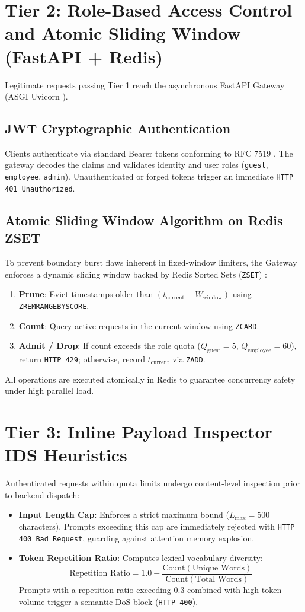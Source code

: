 \section{Tier 2: Role-Based Access Control and Atomic Sliding Window (FastAPI + Redis)}
Legitimate requests passing Tier 1 reach the asynchronous FastAPI Gateway (ASGI Uvicorn \cite{fastapi}). 

\subsection{JWT Cryptographic Authentication}
Clients authenticate via standard Bearer tokens conforming to RFC 7519 \cite{rfc7519}. The gateway decodes the claims and validates identity and user roles (\texttt{guest}, \texttt{employee}, \texttt{admin}). Unauthenticated or forged tokens trigger an immediate \texttt{HTTP 401 Unauthorized}.

\subsection{Atomic Sliding Window Algorithm on Redis ZSET}
To prevent boundary burst flaws inherent in fixed-window limiters, the Gateway enforces a dynamic sliding window backed by Redis Sorted Sets (\texttt{ZSET}) \cite{redis}:
\begin{enumerate}
    \item \textbf{Prune}: Evict timestamps older than $(t_{\text{current}} - W_{\text{window}})$ using \texttt{ZREMRANGEBYSCORE}.
    \item \textbf{Count}: Query active requests in the current window using \texttt{ZCARD}.
    \item \textbf{Admit / Drop}: If count exceeds the role quota ($Q_{\text{guest}}=5$, $Q_{\text{employee}}=60$), return \texttt{HTTP 429}; otherwise, record $t_{\text{current}}$ via \texttt{ZADD}.
\end{enumerate}
All operations are executed atomically in Redis to guarantee concurrency safety under high parallel load.

\section{Tier 3: Inline Payload Inspector IDS Heuristics}
Authenticated requests within quota limits undergo content-level inspection prior to backend dispatch:
\begin{itemize}
    \item \textbf{Input Length Cap}: Enforces a strict maximum bound ($L_{\max}=500$ characters). Prompts exceeding this cap are immediately rejected with \texttt{HTTP 400 Bad Request}, guarding against attention memory explosion.
    \item \textbf{Token Repetition Ratio}: Computes lexical vocabulary diversity:
    \begin{equation}
        \text{Repetition Ratio} = 1.0 - \frac{\text{Count}(\text{Unique Words})}{\text{Count}(\text{Total Words})}
    \end{equation}
    Prompts with a repetition ratio exceeding $0.3$ combined with high token volume trigger a semantic DoS block (\texttt{HTTP 400}).
\end{itemize}

